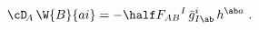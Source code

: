 \begin{equation} \label{DW}
  \cD_{\!A}\, \W{B}{ai} = -\half F_{AB}{}^I\, \bar{g}_{I\ab}^i\,
  h^{\ab a}\ .
 \end{equation}

